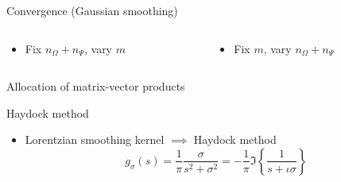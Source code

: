\documentclass[aspectratio=169, leqno, 12pt]{beamer}
\begin{document}
\begin{frame}{Convergence (Gaussian smoothing)}
    \begin{columns}
        \begin{column}{0.5\textwidth}
            \begin{itemize}
                \item Fix $n_{\Omega} + n_{\Psi}$, vary $m$
            \end{itemize}
            \scalebox{1.0}{}
        \end{column}
        \begin{column}{0.5\textwidth}
            \begin{itemize}
                \item Fix $m$, vary $n_{\Omega} + n_{\Psi}$
            \end{itemize}
            \scalebox{1.0}{}
        \end{column}
    \end{columns}
\end{frame}

\begin{frame}{Allocation of matrix-vector products}
    
\end{frame}

\begin{frame}{Haydock method}
    \begin{itemize}
        \item Lorentzian smoothing kernel $\implies$ Haydock method \cite{lin2016review}
    \begin{equation}
        g_{\sigma}(s) = \frac{1}{\pi} \frac{\sigma}{s^2 + \sigma^2} = -\frac{1}{\pi} \Im\left\{ \frac{1}{s + \iota \sigma} \right\}
    \end{equation}
    \end{itemize}
    \centering
    
\end{frame}
 
\end{document}
